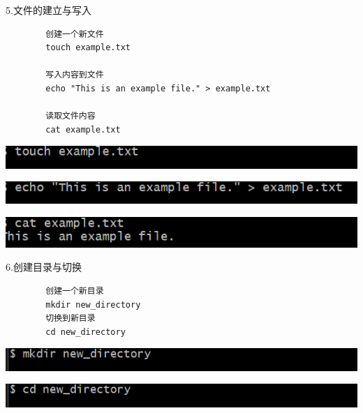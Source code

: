 \documentclass{article}
\begin{document}
	5.文件的建立与写入
	\begin{verbatim}
		创建一个新文件
		touch example.txt
		
		写入内容到文件
		echo "This is an example file." > example.txt
		
		读取文件内容
		cat example.txt     
	\end{verbatim}
	
	
	\noindent
	\begin{minipage}{\linewidth}
		\centering
		\includegraphics[width=0.5\linewidth]{example5.1.png}
	\end{minipage}
	\noindent
	\begin{minipage}{\linewidth}
		\centering
		\includegraphics[width=0.5\linewidth]{example5.2.png}
	\end{minipage}
	\noindent
	\begin{minipage}{\linewidth}
		\centering
		\includegraphics[width=0.5\linewidth]{example5.3.png}
		\label{fig:example}
	\end{minipage}
	
	6.创建目录与切换
	\begin{verbatim}
		创建一个新目录
		mkdir new_directory
		切换到新目录
		cd new_directory
	\end{verbatim}
	
	
	
	\noindent
	\begin{minipage}{\linewidth}
		\centering
		\includegraphics[width=0.5\linewidth]{example6.1.png}
	\end{minipage}
	\noindent
	\begin{minipage}{\linewidth}
		\centering
		\includegraphics[width=0.5\linewidth]{example6.2.png}
		\label{fig:example}
	\end{minipage}
	
\end{document}
